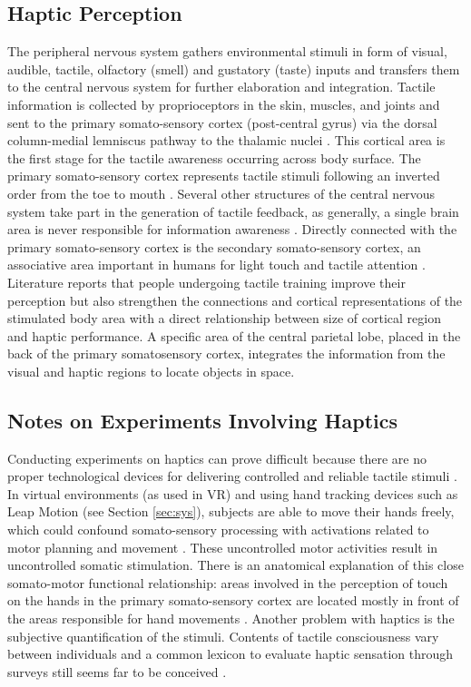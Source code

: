 \documentclass{article}
\begin{document}
\subsection{Haptic Perception}
The peripheral nervous system gathers environmental stimuli in form of visual, audible, tactile, olfactory (smell) and gustatory (taste) inputs and transfers them to the central nervous system for further elaboration and integration. Tactile information is collected by proprioceptors in the skin, muscles, and joints and sent to the primary somato-sensory cortex (post-central gyrus) via the dorsal column-medial lemniscus pathway to the thalamic nuclei \cite{Blatow2007}. This cortical area is the first stage for the tactile awareness occurring across body surface. The primary somato-sensory cortex represents tactile stimuli following an inverted order from the toe to mouth \cite{Narici1999}. Several other structures of the central nervous system take part in the generation of tactile feedback, as generally, a single brain area is never responsible for information awareness \cite{Manzoni1986}. Directly connected with the primary somato-sensory cortex is the secondary somato-sensory cortex, an associative area important in humans for light touch and tactile attention \cite{Eickhoff2005}. Literature reports that people undergoing tactile training improve their perception but also strengthen the connections and cortical representations of the stimulated body area \cite{Saito2007} with a direct relationship between size of cortical region and haptic performance. A specific area of the central parietal lobe, placed in the back of the primary somatosensory cortex, integrates the information from the visual and haptic regions to locate objects in space. 

\subsection{Notes on Experiments Involving Haptics}
Conducting experiments on haptics can prove difficult because there are no proper technological devices for delivering controlled and reliable tactile stimuli \cite{Gallace2012}. In virtual environments (as used in VR) and using hand tracking devices such as Leap Motion \cite{leapwebsite} (see Section \ref{sec:sys}), subjects are able to move their hands freely, which could confound somato-sensory processing with activations related to motor planning and movement \cite{Bodegard2001}. These uncontrolled motor activities result in uncontrolled somatic stimulation. There is an anatomical explanation of this close somato-motor functional relationship: areas involved in the perception of touch on the hands in the primary somato-sensory cortex are located mostly in front of the areas responsible for hand movements \cite{Penfield1950}.
Another problem with haptics is the subjective quantification of the stimuli. Contents of tactile consciousness vary between individuals and a common lexicon to evaluate haptic sensation through surveys still seems far to be conceived \cite{Gallace2010}.
\end{document}
